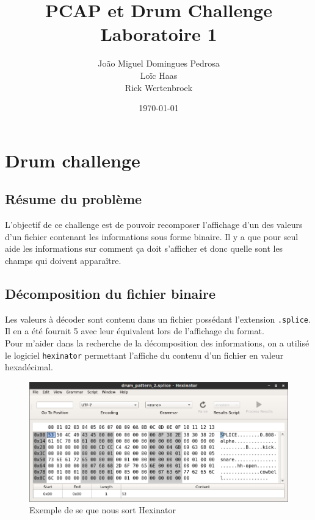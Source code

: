 \documentclass[10pt,a4paper]{article}
\author{João Miguel Domingues Pedrosa \\
Loïc Haas\\
Rick Wertenbroek}
\title{PCAP et Drum Challenge \\ Laboratoire 1}
\date{\today}
\begin{document}
\maketitle
\newpage
\tableofcontents
\newpage


\section{Drum challenge}

\subsection{Résume du problème}

L'objectif de ce challenge est de pouvoir recomposer l'affichage d'un des valeurs d'un fichier contenant les informations sous forme binaire. Il y a que pour seul aide les informations sur comment ça doit s'afficher et donc quelle sont les champs qui doivent apparaître.

\subsection{Décomposition du fichier binaire}

Les valeurs à décoder sont contenu dans un fichier possédant l'extension \texttt{.splice}. Il en a été fournit 5 avec leur équivalent lors de l'affichage du format.\\

Pour m'aider dans la recherche de la décomposition des informations, on a utilisé le logiciel \texttt{hexinator} permettant l'affiche du contenu d'un fichier en valeur hexadécimal.

\begin{figure}[htc]
	\includegraphics[scale=0.51]{images/hexa.png}
	\caption{Exemple de se que nous sort Hexinator}
\end{figure}
\end{document}

